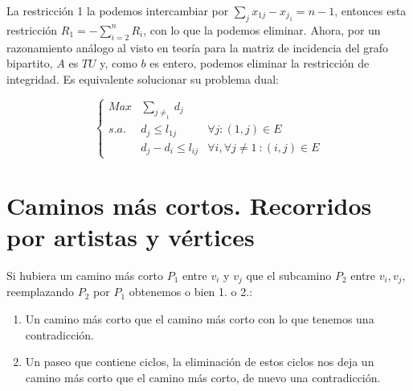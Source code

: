 \documentclass[openany]{book}
\begin{document}
\begin{exercise}
    La restricción 1 la podemos intercambiar por $ \sum\limits_{j}^{}x_{1j}-x_{j_1} = n-1 $, entonces esta restricción $ R_1 = - \sum\limits_{i=2}^{n} R_i $, con lo que la podemos eliminar. Ahora, por un razonamiento análogo al visto en teoría para la matriz de incidencia del grafo bipartito, $ A $ es $ TU $ y, como $ b $ es entero, podemos eliminar la restricción de integridad. Es equivalente solucionar su problema dual:

    $$ \left\{
    \begin{array}{llr}
        Max & \sum\limits_{j\ne_1}^{}d_j\\
        s.a. & d_j \leq l_{1j} & \forall j:(1,j) \in E\\
        & d_j-d_i \leq l_{ij} & \forall i, \forall j \ne 1\ : (i,j) \in E
    \end{array}
    \right. $$
    

\end{exercise}






\chapter{Caminos más cortos. Recorridos por artistas y vértices}





\begin{demonstration}
    Si hubiera un camino más corto $ P_1 $ entre $ v_i $ y $ v_j $ que el subcamino $ P_2 $ entre $ v_i,v_j $, reemplazando $ P_2 $ por $ P_1 $ obtenemos o bien 1. o 2.:
    \begin{enumerate}
        \item Un camino más corto que el camino más corto con lo que tenemos una contradicción.
        \item Un paseo que contiene ciclos, la eliminación de estos ciclos nos deja un camino más corto que el camino más corto, de nuevo una contradicción.
    \end{enumerate}
\end{demonstration}

\end{document}
